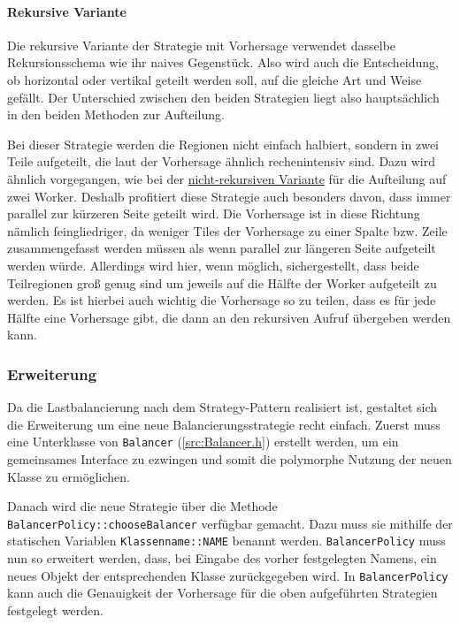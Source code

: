 \paragraph*{Rekursive Variante}
Die rekursive Variante der Strategie mit Vorhersage verwendet dasselbe Rekursionsschema wie ihr naives Gegenstück.
Also wird auch die Entscheidung, ob horizontal oder vertikal geteilt werden soll, auf die gleiche Art und Weise gefällt.
Der Unterschied zwischen den beiden Strategien liegt also hauptsächlich in den beiden Methoden zur Aufteilung.

Bei dieser Strategie werden die Regionen nicht einfach halbiert, sondern in zwei Teile aufgeteilt, die laut der Vorhersage ähnlich rechenintensiv sind.
Dazu wird ähnlich vorgegangen, wie bei der \hyperref[lastbalancierung_vorhersage]{nicht-rekursiven Variante} für die Aufteilung auf zwei Worker.
Deshalb profitiert diese Strategie auch besonders davon, dass immer parallel zur kürzeren Seite geteilt wird.
Die Vorhersage ist in diese Richtung nämlich feingliedriger, da weniger Tiles der Vorhersage zu einer Spalte bzw. Zeile zusammengefasst werden müssen als wenn parallel zur längeren Seite aufgeteilt werden würde.
Allerdings wird hier, wenn möglich, sichergestellt, dass beide Teilregionen groß genug sind um jeweils auf die Hälfte der Worker aufgeteilt zu werden.
Es ist hierbei auch wichtig die Vorhersage so zu teilen, dass es für jede Hälfte eine Vorhersage gibt, die dann an den rekursiven Aufruf übergeben werden kann.

\subsubsection{Erweiterung}\label{lastbalancierung_erweiterung}

Da die Lastbalancierung nach dem Strategy-Pattern realisiert ist, gestaltet sich die Erweiterung um eine neue Balancierungsstrategie recht einfach.
Zuerst muss eine Unterklasse von \verb|Balancer| (\autoref{src:Balancer.h}) erstellt werden, um ein gemeinsames Interface zu ezwingen und somit die polymorphe Nutzung der neuen Klasse zu ermöglichen.

\begin{figure}[h!]
	
\end{figure}

Danach wird die neue Strategie über die Methode \verb|BalancerPolicy::chooseBalancer| verfügbar gemacht.
Dazu muss sie mithilfe der statischen Variablen \verb|Klassenname::NAME| benannt werden.
\verb|BalancerPolicy| muss nun so erweitert werden, dass, bei Eingabe des vorher festgelegten Namens, ein neues Objekt der entsprechenden Klasse zurückgegeben wird.
In \verb|BalancerPolicy| kann auch die Genauigkeit der Vorhersage für die oben aufgeführten Strategien festgelegt werden.


